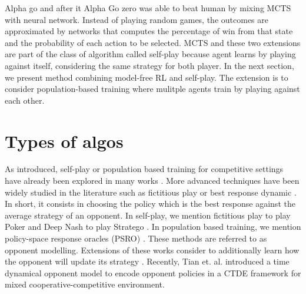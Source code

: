 Alpha go \citep{silver2016mastering} and after it Alpha Go zero \citep{silver2017mastering} was able to beat human by mixing MCTS with neural network.
Instead of playing random games, the outcomes are approximated by networks that computes the percentage of win from that state and the probability of each action to be selected.
MCTS and these two extensions are part of the class of algorithm called self-play because agent learns by playing against itself, considering the same strategy for both player.
In the next section, we present method combining model-free RL and self-play.
The extension is to consider population-based training where mulitple agents train by playing against each other.

\section{Types of algos}\label{sec:ch6_algo}

As introduced, self-play or population based training for competitive settings have already been explored in many works \citep{jaderberg2019human, vinyals2019grandmaster, baker2019emergent}.
More advanced techniques have been widely studied in the literature such as fictitious play \cite{brown1951iterative} or best response dynamic \citep{baudin2022fictitious}.
In short, it consists in choosing the policy which is the best response against the average strategy of an opponent.
In self-play, we mention fictitious play to play Poker \citep{pmlr-v37-heinrich15} and Deep Nash to play Stratego \citep{DM_stratego}.
In population based training, we mention policy-space response oracles (PSRO) \citep{NIPS2017_3323fe11, Muller2020A}.
These methods are referred to as opponent modelling.
Extensions of these works consider to additionally learn how the opponent will update its strategy \citep{he2016opponent, foerster2017learning}.
Recently, Tian et. al. \citep{tian2022multi} introduced a time dynamical opponent model to encode opponent policies in a CTDE framework for mixed cooperative-competitive environment.